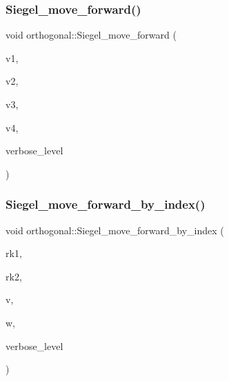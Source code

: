\mbox{\label{classorthogonal_a065d0faccc00df42afd671dac644d480}} 
\subsubsection{\texorpdfstring{Siegel\+\_\+move\+\_\+forward()}{Siegel\_move\_forward()}}
{\footnotesize\ttfamily void orthogonal\+::\+Siegel\+\_\+move\+\_\+forward (\begin{DoxyParamCaption}\item[{\mbox{\hyperlink{galois_8h_a09fddde158a3a20bd2dcadb609de11dc}{I\+NT}} $\ast$}]{v1,  }\item[{\mbox{\hyperlink{galois_8h_a09fddde158a3a20bd2dcadb609de11dc}{I\+NT}} $\ast$}]{v2,  }\item[{\mbox{\hyperlink{galois_8h_a09fddde158a3a20bd2dcadb609de11dc}{I\+NT}} $\ast$}]{v3,  }\item[{\mbox{\hyperlink{galois_8h_a09fddde158a3a20bd2dcadb609de11dc}{I\+NT}} $\ast$}]{v4,  }\item[{\mbox{\hyperlink{galois_8h_a09fddde158a3a20bd2dcadb609de11dc}{I\+NT}}}]{verbose\+\_\+level }\end{DoxyParamCaption})}

\mbox{\label{classorthogonal_a606e885cb85b824bcda44154a3cfbfe8}} 
\subsubsection{\texorpdfstring{Siegel\+\_\+move\+\_\+forward\+\_\+by\+\_\+index()}{Siegel\_move\_forward\_by\_index()}}
{\footnotesize\ttfamily void orthogonal\+::\+Siegel\+\_\+move\+\_\+forward\+\_\+by\+\_\+index (\begin{DoxyParamCaption}\item[{\mbox{\hyperlink{galois_8h_a09fddde158a3a20bd2dcadb609de11dc}{I\+NT}}}]{rk1,  }\item[{\mbox{\hyperlink{galois_8h_a09fddde158a3a20bd2dcadb609de11dc}{I\+NT}}}]{rk2,  }\item[{\mbox{\hyperlink{galois_8h_a09fddde158a3a20bd2dcadb609de11dc}{I\+NT}} $\ast$}]{v,  }\item[{\mbox{\hyperlink{galois_8h_a09fddde158a3a20bd2dcadb609de11dc}{I\+NT}} $\ast$}]{w,  }\item[{\mbox{\hyperlink{galois_8h_a09fddde158a3a20bd2dcadb609de11dc}{I\+NT}}}]{verbose\+\_\+level }\end{DoxyParamCaption})}


